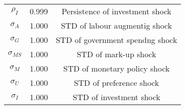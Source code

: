 \begin{center}
\begin{longtable}{ccc}
${\rho_{I}}$ 	 & 	 0.999 	 & 	 Persistence of investment shock\\
${\sigma_{A}}$ 	 & 	 1.000 	 & 	 STD of labour augmentig shock\\
${\sigma_{G}}$ 	 & 	 1.000 	 & 	 STD of government spendng shock\\
${\sigma_{MS}}$ 	 & 	 1.000 	 & 	 STD of mark-up shock\\
${\sigma_{M}}$ 	 & 	 1.000 	 & 	 STD of monetary policy shock\\
${\sigma_{U}}$ 	 & 	 1.000 	 & 	 STD of preference shock\\
${\sigma_{I}}$ 	 & 	 1.000 	 & 	 STD of investment shock\\
\bottomrule%
\end{longtable}
\end{center}
